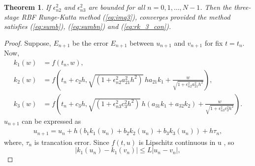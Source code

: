\documentclass[a4paper, preprint,11pt]{elsarticle}
\newtheorem{theorem}{Theorem}[section]
\numberwithin{equation}{section}
\begin{document}
\begin{theorem} If $\epsilon_{n2}^2$ and $\epsilon_{n3}^2$
are bounded for all $n = 0, 1, \dots, N - 1$. Then the
three-stage RBF Runge-Kutta method (\ref{eq:imq3}), converges provided the method satisfies (\ref{eq:sumb}), (\ref{eq:sumbn}) and
(\ref{eq:rk_3_con}).
\end{theorem}
\begin{proof} Suppose, $E_{n+1}$ be the error $E_{n+1}$  between $u_{n+1}$ and $v_{n+1}$ for fix $t = t_n$. Now,
\begin{align*}
k_1(w) &= f(t_n, w), \\
k_2(w) &= f\left(t_n + c_2h, \sqrt{(1 + \epsilon_{n2}^2 a_{21}^2 h^2)} \,  h a_{21}k_1 + \frac{w} {\sqrt{1 + \epsilon_{n2}^2 a_{21}^2 h^2}}\right), \\
k_3(w) &= f\left(t_n + c_3h, \sqrt{(1 + \epsilon_{n3}^2 c_{3}^2 h^2)} \, h (a_{31}k_1 + a_{32}k_2)+\frac{w} {\sqrt{1 + \epsilon_{n3}^2 c_3^2 h^2}}\right).
\end{align*}
$u_{n+1}$ can be expressed as
\begin{align*}
 u_{n+1} = u_n + h (b_1k_1(u_n) + b_2k_2(u_n) + b_3k_3(u_n)) + h \tau_n,
\end{align*}
where, $\tau_n$ is trancation error.
 Since $f(t,u)$ is Lipschitz continuous in u , so
 \begin{equation*}
     |k_1(u_n) - k_1(v_n)|\leq L|u_n - v_n|,
 \end{equation*}


\end{proof}
\end{document}
